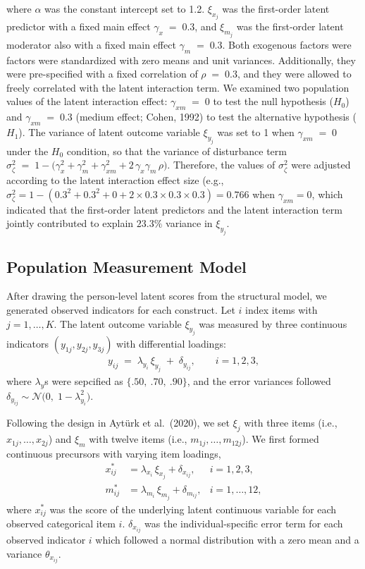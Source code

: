 \documentclass[
  man]{apa6}
\begin{document}
where \(\alpha\) was the constant intercept set to 1.2. \(\xi_{x_{j}}\) was
the first-order latent predictor with a fixed main effect
\(\gamma_{x} \;=\; 0.3\), and \(\xi_{m_{j}}\) was the first-order latent
moderator also with a fixed main effect \(\gamma_{m} \;=\; 0.3\). Both
exogenous factors were factors were standardized with zero means and
unit variances. Additionally, they were pre-specified with a fixed
correlation of \(\rho \;=\; 0.3\), and they were allowed to freely correlated with the latent interaction term. We examined two population values of
the latent interaction effect: \(\gamma_{xm} \;=\; 0\) to test the null
hypothesis (\(H_{0}\)) and \(\gamma_{xm} \;=\; 0.3\) (medium effect; Cohen,
1992) to test the alternative hypothesis (\(H_{1}\)). The variance of
latent outcome variable \(\xi_{y_{j}}\) was set to 1 when
\(\gamma_{xm} \;=\; 0\) under the \(H_{0}\) condition, so that the variance
of disturbance term
\(\sigma^2_{\zeta} \;=\; 1 - \big(\gamma_x^2 + \gamma_m^2 + \gamma_{xm}^2 + 2\,\gamma_x\gamma_m\,\rho \big)\).
Therefore, the values of \(\sigma^2_{\zeta}\) were adjusted according to
the latent interaction effect size (e.g.,
\(\sigma_\zeta^2 = 1 - \left(0.3^2 + 0.3^2 + 0 + 2 \times 0.3 \times 0.3 \times 0.3\right) = 0.766\)
when \(\gamma_{xm} = 0\), which indicated that the first-order latent
predictors and the latent interaction term jointly contributed to
explain \(23.3\%\) variance in \(\xi_{y_{j}}\).

\subsection{Population Measurement Model}\label{population-measurement-model}

After drawing the person-level latent scores from the structural model,
we generated observed indicators for each construct. Let \(i\) index items with \(j=1,\ldots,K\). The latent outcome variable \(\xi_{y_j}\) was measured by three continuous indicators \((y_{1j},y_{2j},y_{3j})\) with differential loadings:
\begin{align}
y_{ij} \;=\; \lambda_{y_i}\,\xi_{y_j} \;+\; \delta_{y_{ij}},
\qquad i = 1,2,3,
\end{align}
where \(\lambda_{y}\)s were sepcified as \(\{.50,\ .70,\ .90\}\), and the error variances followed
\(\delta_{y_{ij}}\sim\mathcal{N}\!\big(0,\;1-\lambda_{y_i}^{2}\big)\).

Following the design in Aytürk et al.~(2020), we set \(\xi_{j}\) with three items (i.e., \(x_{1j},\ldots,x_{2j}\)) and \(\xi_{m}\) with twelve items (i.e., \(m_{1j},\ldots,m_{12j}\)). We first formed continuous precursors with varying item loadings,
\begin{align}
x^{\ast}_{ij} &= \lambda_{x_i}\,\xi_{x_j} + \delta_{x_{ij}}, 
& i=1,2,3, \\
m^{\ast}_{ij} &= \lambda_{m_i}\,\xi_{m_j} + \delta_{m_{ij}}, 
& i=1,\ldots,12,
\end{align}
where \(x_{ij}^*\) was the score of the underlying latent continuous variable for each observed categorical item \(i\). \(\delta_{x_{ij}}\) was the individual-specific error term for each
observed indicator \(i\) which followed a normal distribution with a zero mean and a variance \(\theta_{x_{ij}}\).
\end{document}
